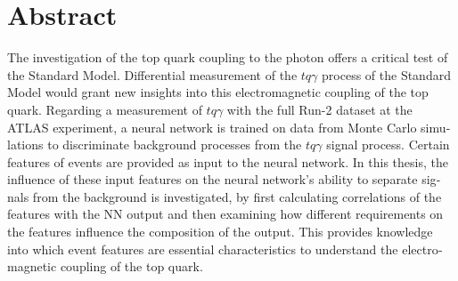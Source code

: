 \thispagestyle{plain}
\nocite{PhysRevLett.121.221802}

\section*{Abstract}
\begin{english}
The investigation of the top quark coupling to the photon offers a critical test of the Standard Model.
Differential measurement of the $tq\gamma$ process of the Standard Model would grant new insights into this electromagnetic coupling of the top quark. 
Regarding a measurement of $tq\gamma$ with the full Run-2 dataset at the ATLAS experiment, a neural network is trained on data from Monte Carlo simulations to discriminate background processes from the $tq\gamma$ signal process. 
Certain features of events are provided as input to the neural network. 
In this thesis, the influence of these input features on the neural network's ability to separate signals from the background is investigated, 
by first calculating correlations of the features with the NN output and then examining how different requirements on the features influence the composition of the output. 
This provides knowledge into which event features are essential characteristics to understand the electromagnetic coupling of the top quark.
\end{english}
